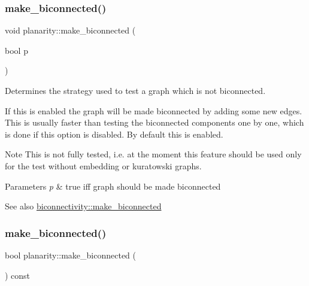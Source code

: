 \subsubsection{\texorpdfstring{make\+\_\+biconnected()}{make\_biconnected()}\hspace{0.1cm}{\footnotesize\ttfamily [1/2]}}
{\footnotesize\ttfamily void planarity\+::make\+\_\+biconnected (\begin{DoxyParamCaption}\item[{bool}]{p }\end{DoxyParamCaption})\hspace{0.3cm}{\ttfamily [inline]}}



Determines the strategy used to test a graph which is not biconnected. 

If this is enabled the graph will be made biconnected by adding some new edges. This is usually faster than testing the biconnected components one by one, which is done if this option is disabled. By default this is enabled.

\begin{DoxyNote}{Note}
This is not fully tested, i.\+e. at the moment this feature should be used only for the test without embedding or kuratowski graphs.
\end{DoxyNote}

\begin{DoxyParams}{Parameters}
{\em p} & true iff graph should be made biconnected\\
\hline
\end{DoxyParams}
\begin{DoxySeeAlso}{See also}
\mbox{\hyperlink{classbiconnectivity_a774fd08203a6d164605afc4cdc8b9201}{biconnectivity\+::make\+\_\+biconnected}} 
\end{DoxySeeAlso}
\mbox{\label{classplanarity_a822d67100814e1887494e7213e6f0531}} 
\subsubsection{\texorpdfstring{make\+\_\+biconnected()}{make\_biconnected()}\hspace{0.1cm}{\footnotesize\ttfamily [2/2]}}
{\footnotesize\ttfamily bool planarity\+::make\+\_\+biconnected (\begin{DoxyParamCaption}{ }\end{DoxyParamCaption}) const\hspace{0.3cm}{\ttfamily [inline]}}



